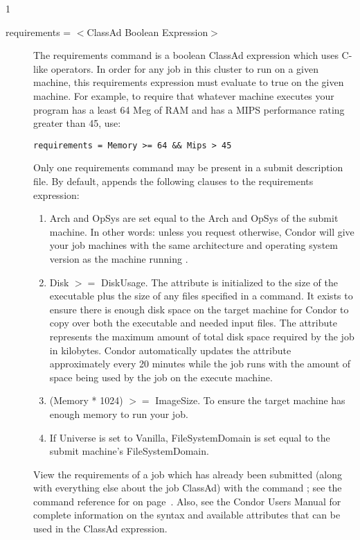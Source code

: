 \begin{ManPage}{\label{man-condor-submit}}{1}
\begin{description}
\item[requirements = $<$ClassAd Boolean Expression$>$]
The requirements
command is a boolean ClassAd expression which uses C-like operators. In
order for any job in this cluster to run on a given machine, this
requirements expression must evaluate to true on the given machine. For
example, to require that whatever machine executes your program has a
least 64 Meg of RAM and has a MIPS performance rating greater than 45,
use:
\begin{verbatim}
requirements = Memory >= 64 && Mips > 45
\end{verbatim}
Only one requirements command may be present in a
submit description file.
By default,  appends the following clauses to
the requirements expression:
\begin{enumerate}
        \item Arch and OpSys are set equal to the Arch and OpSys of the
submit machine.  In other words: unless you request otherwise, Condor will give your
job machines with the same architecture and operating system version as
the machine running .
        \item Disk $>=$ DiskUsage.
The  attribute is initialized to the size of the
executable plus the size of any files specified in a
 command.
It exists to ensure there is enough disk space on the
target machine for Condor to copy over both the executable
and needed input files.
The  attribute represents the maximum amount of
total disk space required by the job in kilobytes.
Condor automatically updates the  attribute
approximately every 20 minutes while the job runs with the
amount of space being used by the job on the execute machine.
        \item (Memory * 1024) $>=$ ImageSize.  To ensure the target machine
has enough memory to run your job.
        \item If Universe is set to Vanilla, FileSystemDomain is set equal to
the submit machine's FileSystemDomain.
\end{enumerate}
View the requirements of a job
which has already been submitted (along with everything else about the
job ClassAd) with the command ; see the command reference for
 on page~\pageref{man-condor-q}.  Also, see the Condor Users
Manual for complete information on the syntax and available attributes
that can be used in the ClassAd expression.



\end{description}
\end{ManPage}
